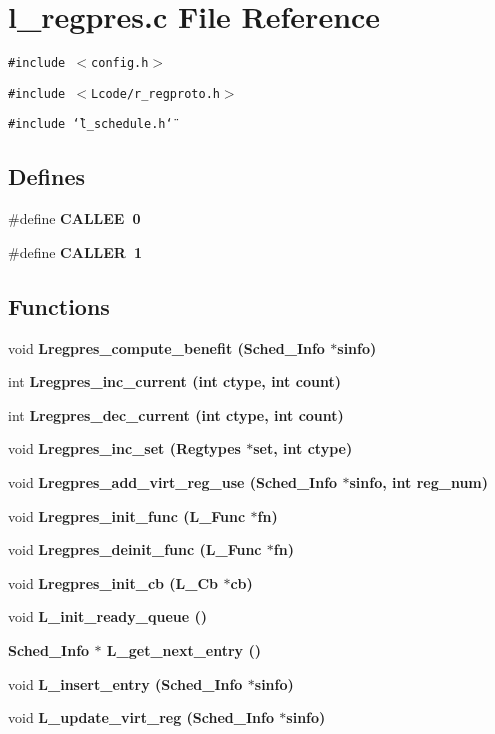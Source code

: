\section{l\_\-regpres.c File Reference}
\label{l__regpres_8c}
{\tt \#include $<$config.h$>$}\par
{\tt \#include $<$Lcode/r\_\-regproto.h$>$}\par
{\tt \#include \char`\"{}l\_\-schedule.h\char`\"{}}\par
\subsection*{Defines}
\begin{CompactItemize}
\item 
\#define \bf{CALLEE}~0
\item 
\#define \bf{CALLER}~1
\end{CompactItemize}
\subsection*{Functions}
\begin{CompactItemize}
\item 
void \bf{Lregpres\_\-compute\_\-benefit} (\bf{Sched\_\-Info} $\ast$sinfo)
\item 
int \bf{Lregpres\_\-inc\_\-current} (int ctype, int count)
\item 
int \bf{Lregpres\_\-dec\_\-current} (int ctype, int count)
\item 
void \bf{Lregpres\_\-inc\_\-set} (\bf{Regtypes} $\ast$set, int ctype)
\item 
void \bf{Lregpres\_\-add\_\-virt\_\-reg\_\-use} (\bf{Sched\_\-Info} $\ast$sinfo, int reg\_\-num)
\item 
void \bf{Lregpres\_\-init\_\-func} (L\_\-Func $\ast$fn)
\item 
void \bf{Lregpres\_\-deinit\_\-func} (L\_\-Func $\ast$fn)
\item 
void \bf{Lregpres\_\-init\_\-cb} (L\_\-Cb $\ast$cb)
\item 
void \bf{L\_\-init\_\-ready\_\-queue} ()
\item 
\bf{Sched\_\-Info} $\ast$ \bf{L\_\-get\_\-next\_\-entry} ()
\item 
void \bf{L\_\-insert\_\-entry} (\bf{Sched\_\-Info} $\ast$sinfo)
\item 
void \bf{L\_\-update\_\-virt\_\-reg} (\bf{Sched\_\-Info} $\ast$sinfo)
\end{CompactItemize}
